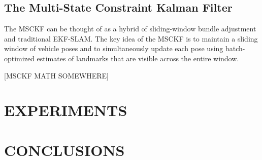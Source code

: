 \documentclass[letterpaper, 10 pt, conference]{ieeeconf}  %
\begin{document}
\subsection{The Multi-State Constraint Kalman Filter} \label{subsec:msckf}
The MSCKF \cite{Mourikis:2007:ICRA} can be thought of as a hybrid of sliding-window bundle adjustment and traditional EKF-SLAM.
The key idea of the MSCKF is to maintain a sliding window of vehicle poses and to simultaneously update each pose using batch-optimized estimates of landmarks that are visible across the entire window.

[MSCKF MATH SOMEWHERE]

\section{EXPERIMENTS} \label{sec:experiments}

\section{CONCLUSIONS} \label{sec:conclusions}



\def\url#1{} %


\end{document}
